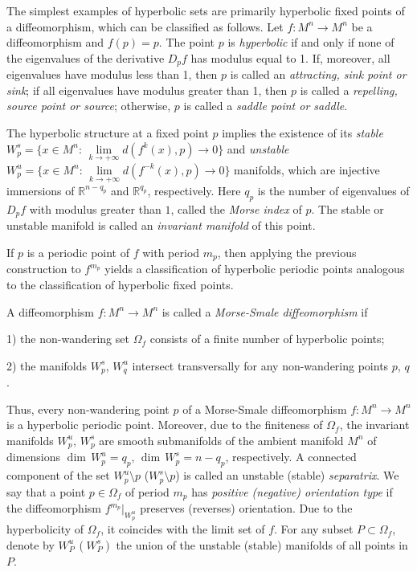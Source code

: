 \documentclass{amsart}
\numberwithin{equation}{section}
\begin{document}
	The simplest examples of hyperbolic sets are primarily hyperbolic fixed points of a diffeomorphism, which can be classified as follows.
	Let $f:M^n\to M^n$ be a diffeomorphism and $f(p)=p$. The point $p$ is {\it hyperbolic} if and only if none of the eigenvalues of the derivative $D_pf$ has modulus equal to 1. If, moreover, all eigenvalues have modulus less than 1, then $p$ is called an {\it attracting, sink point or sink}; if all eigenvalues have modulus greater than 1, then $p$ is called a {\it repelling, source point or source}; otherwise, $p$ is called a {\it saddle point or saddle}.
	
	The hyperbolic structure at a fixed point $p$ implies the existence of its {\it stable} $W^s_p=\{x\in M^n:\,\lim\limits_{k\to +\infty}d(f^{k}(x),p)\to 0\}$ and {\it unstable} $W^u_p=\{x\in M^n:\,\lim\limits_{k\to +\infty}d(f^{-k}(x),p)\to 0\}$ manifolds, which are injective immersions of $\mathbb R^{n-q_p}$ and $\mathbb R^{q_p}$, respectively. Here $q_p$ is the number of eigenvalues of $D_pf$ with modulus greater than $1$, called the {\it Morse index} of $p$. The stable or unstable manifold is called an {\it invariant manifold} of this point.
	
	If $p$ is a periodic point of $f$ with period $m_p$, then applying the previous construction to $f^{m_p}$ yields a classification of hyperbolic periodic points analogous to the classification of hyperbolic fixed points.
	
	A diffeomorphism $f:M^n\to M^n$ is called a {\it Morse-Smale diffeomorphism} if
	
	1) the non-wandering set $\Omega_f$ consists of a finite number of hyperbolic points;
	
	2) the manifolds $W^s_p$, $W^u_q$ intersect transversally for any non-wandering points $p$, $q$.
	
	Thus, every non-wandering point $p$ of a Morse-Smale diffeomorphism $f:M^n\to M^n$ is a hyperbolic periodic point. Moreover, due to the finiteness of $\Omega_f$, the invariant manifolds $W^u_p,\,W^s_p$ are smooth submanifolds of the ambient manifold $M^n$ of dimensions $\dim\,W^u_p=q_p,\,\dim\,W^s_p=n-q_p$, respectively. A connected component of the set $W^u_p\setminus p$ ($W^s_p\setminus p$) is called an unstable (stable) {\it separatrix}. We say that a point $p\in\Omega_f$ of period $m_p$ has {\it positive (negative) orientation type} if the diffeomorphism $f^{m_p}|_{W^u_p}$ preserves (reverses) orientation. Due to the hyperbolicity of $\Omega_f$, it coincides with the limit set of $f$. For any subset $P\subset\Omega_f$, denote by $W^u_P\,(W^s_P)$ the union of the unstable (stable) manifolds of all points in $P$.
	
\end{document}
